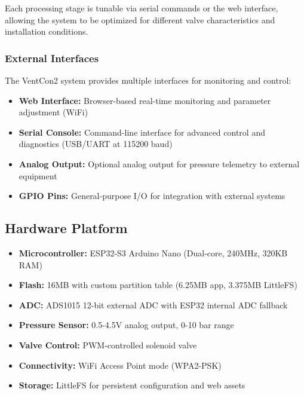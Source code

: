 \documentclass[12pt,a4paper]{article}
\begin{document}
Each processing stage is tunable via serial commands or the web interface, allowing the system to be optimized for different valve characteristics and installation conditions.

\subsubsection{External Interfaces}

The VentCon2 system provides multiple interfaces for monitoring and control:

    \begin{itemize}
        \item \textbf{Web Interface:} Browser-based real-time monitoring and parameter adjustment (WiFi)
        \item \textbf{Serial Console:} Command-line interface for advanced control and diagnostics (USB/UART at 115200 baud)
        \item \textbf{Analog Output:} Optional analog output for pressure telemetry to external equipment
        \item \textbf{GPIO Pins:} General-purpose I/O for integration with external systems
    \end{itemize}

 
\subsection{Hardware Platform}
\begin{itemize}
    \item \textbf{Microcontroller:} ESP32-S3 Arduino Nano (Dual-core, 240MHz, 320KB RAM)
    \item \textbf{Flash:} 16MB with custom partition table (6.25MB app, 3.375MB LittleFS)
    \item \textbf{ADC:} ADS1015 12-bit external ADC with ESP32 internal ADC fallback
    \item \textbf{Pressure Sensor:} 0.5-4.5V analog output, 0-10 bar range
    \item \textbf{Valve Control:} PWM-controlled solenoid valve
    \item \textbf{Connectivity:} WiFi Access Point mode (WPA2-PSK)
    \item \textbf{Storage:} LittleFS for persistent configuration and web assets
\end{itemize}
\end{document}
